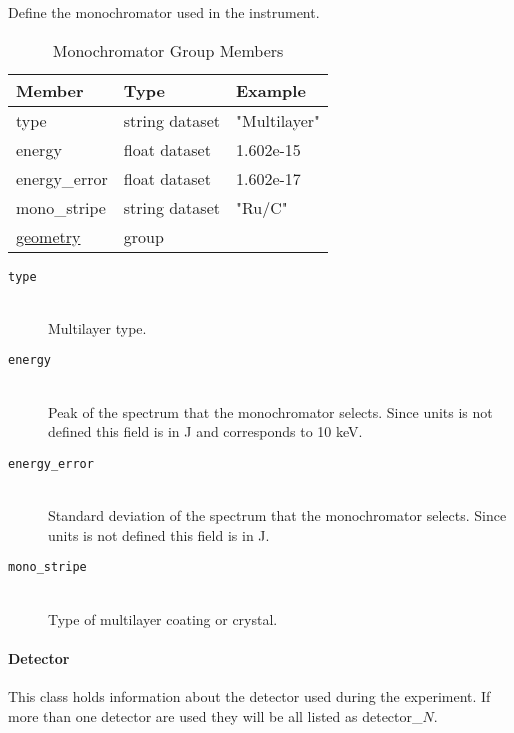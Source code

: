 Define the monochromator used in the instrument.

\begin{table}[h!]\sffamily \footnotesize
\centering
\caption{Monochromator Group Members}
\begin{tabular}{l l l}
\toprule
\bfseries Member     & \bfseries Type & \bfseries Example \\
\midrule
type & string dataset & "Multilayer" \\
energy & float dataset & 1.602e-15 \\
energy\_error & float dataset & 1.602e-17 \\
mono\_stripe & string dataset & "Ru/C" \\
\hyperref[table:geometry]{geometry} &  group & \\
\bottomrule
\end{tabular}
\end{table}

\begin{description}
\item[\tt {type}] \hfill \\
{Multilayer type.}

\item[\tt {energy}] \hfill \\
{Peak of the spectrum that the  monochromator selects. Since units is not
defined this field is in J and corresponds to 10 keV.}

\item[\tt {energy\_error}] \hfill \\
{Standard deviation of the spectrum that the monochromator selects. Since units
is not defined this field is in J.}

\item[\tt {mono\_stripe}] \hfill \\
{Type of multilayer coating or crystal.}
\end{description}


\paragraph{Detector}
\label{table:detector}

This class holds information about the detector used during the experiment. 
If more than one detector are used they will be all listed as detector\_$N$.

